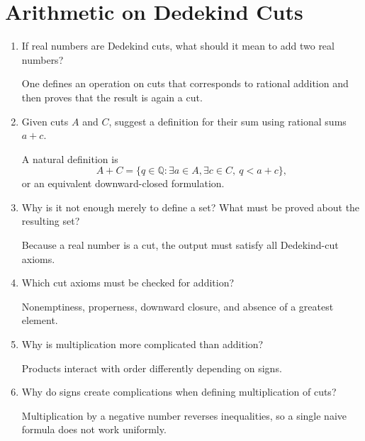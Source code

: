 \documentclass{self-check}
\begin{document}
\section{Arithmetic on Dedekind Cuts}

\begin{enumerate}[label=\arabic*., itemsep=10pt]

\item If real numbers are Dedekind cuts, what should it mean to add two real numbers?

\begin{answer}
One defines an operation on cuts that corresponds to rational addition and then proves that the result is again a cut.
\end{answer}

\item Given cuts $A$ and $C$, suggest a definition for their sum using rational sums $a+c$.

\begin{answer}
A natural definition is
\[
A+C=\{q\in\mathbb{Q}:\exists a\in A,\exists c\in C,\ q<a+c\},
\]
or an equivalent downward-closed formulation.
\end{answer}

\item Why is it not enough merely to define a set? What must be proved about the resulting set?

\begin{answer}
Because a real number is a cut, the output must satisfy all Dedekind-cut axioms.
\end{answer}

\item Which cut axioms must be checked for addition?

\begin{answer}
Nonemptiness, properness, downward closure, and absence of a greatest element.
\end{answer}

\item Why is multiplication more complicated than addition?

\begin{answer}
Products interact with order differently depending on signs.
\end{answer}

\item Why do signs create complications when defining multiplication of cuts?

\begin{answer}
Multiplication by a negative number reverses inequalities, so a single naive formula does not work uniformly.
\end{answer}


\end{enumerate}
\end{document}
